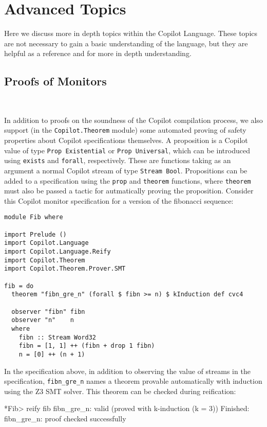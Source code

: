 \section{Advanced Topics} \label{sec:advanced}

Here we discuss more in depth topics within the Copilot Language. These topics
are not necessary to gain a basic understanding of the language, but they are 
helpful as a reference and for more in depth understanding. 

\subsection{Proofs of Monitors}~\label{subsec:proof}

In addition to proofs on the soundness of the Copilot compilation process, we
also support (in the {\tt Copilot.Theorem} module) some automated proving of
safety properties about Copilot specifications themselves. A proposition is a
Copilot value of type \lstinline{Prop Existential} or \lstinline{Prop Universal},
 which can be introduced using \lstinline{exists} and
\lstinline{forall}, respectively. These are functions taking as an argument a
normal Copilot stream of type \lstinline{Stream Bool}. Propositions can be added
to a specification using the \lstinline{prop} and \lstinline{theorem} functions,
where \lstinline{theorem} must also be passed a tactic for autmatically proving
the proposition. Consider this Copilot monitor specification for a version of
the fibonacci sequence:

\begin{lstlisting}[language = Copilot]
module Fib where

import Prelude ()
import Copilot.Language
import Copilot.Language.Reify
import Copilot.Theorem
import Copilot.Theorem.Prover.SMT

fib = do
  theorem "fibn_gre_n" (forall $ fibn >= n) $ kInduction def cvc4

  observer "fibn" fibn
  observer "n"    n
  where
    fibn :: Stream Word32
    fibn = [1, 1] ++ (fibn + drop 1 fibn)
    n = [0] ++ (n + 1)
\end{lstlisting}

In the specification above, in addition to observing the value of streams in
the specification, \lstinline{fibn_gre_n} names a theorem provable
automatically with induction using the Z3 SMT solver. This theorem can be
checked during reification:

\begin{code}
*Fib> reify fib
fibn_gre_n: valid (proved with k-induction (k = 3))
Finished: fibn_gre_n: proof checked successfully
\end{code}

